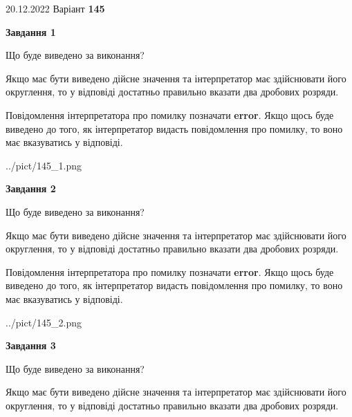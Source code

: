 \documentclass[12pt, ukrainian]{article}
\begin{document}
{20.12.2022 Варіант \No \textbf { 145 }\par}
{
\begin {Large}

{\begin {center}\textbf{Завдання 1}\end {center}}\par
Що буде виведено за виконання? \par

Якщо має бути виведено дійсне значення та інтерпретатор має здійснювати його округлення, 
то у відповіді достатньо правильно вказати два дробових розряди.

Повідомлення інтерпретатора про помилку позначати \textbf{error}.
Якщо щось буде виведено до того, як інтерпретатор видасть повідомлення про помилку, 
то воно має вказуватись у відповіді. \par

\begin{center}
	{../pict/145_1.png}
\end{center}
\newpage

{\begin {center}\textbf{Завдання 2}\end {center}}\par
Що буде виведено за виконання? \par

Якщо має бути виведено дійсне значення та інтерпретатор має здійснювати його округлення, 
то у відповіді достатньо правильно вказати два дробових розряди.

Повідомлення інтерпретатора про помилку позначати \textbf{error}.
Якщо щось буде виведено до того, як інтерпретатор видасть повідомлення про помилку, 
то воно має вказуватись у відповіді. \par

\begin{center}
	{../pict/145_2.png}
\end{center}
\newpage

{\begin {center}\textbf{Завдання 3}\end {center}}\par
Що буде виведено за виконання? \par

Якщо має бути виведено дійсне значення та інтерпретатор має здійснювати його округлення, 
то у відповіді достатньо правильно вказати два дробових розряди.


\end{Large}}
\end{document}
